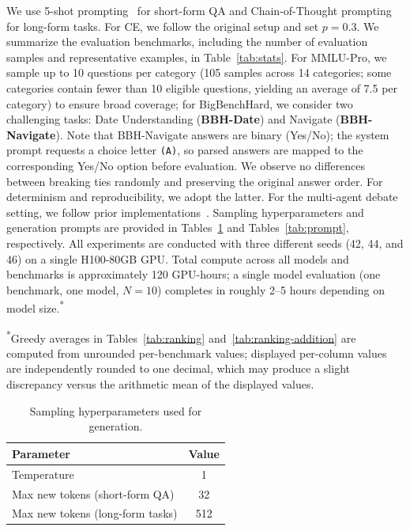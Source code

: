 We use 5-shot prompting~\citep{brown2020language} for short-form QA and Chain-of-Thought prompting~\citep{wei2022chain} for long-form tasks. For CE, we follow the original setup and set $p{=}0.3$. 
We summarize the evaluation benchmarks, including the number of evaluation samples and representative examples, in Table~\ref{tab:stats}. For MMLU-Pro, we sample up to 10 questions per category (105 samples across 14 categories; some categories contain fewer than 10 eligible questions, yielding an average of 7.5 per category) to ensure broad coverage; for BigBenchHard, we consider two challenging tasks: Date Understanding (\textbf{BBH-Date}) and Navigate (\textbf{BBH-Navigate}). Note that BBH-Navigate answers are binary (Yes/No); the system prompt requests a choice letter \texttt{(A)}, so parsed answers are mapped to the corresponding Yes/No option before evaluation.
We observe no differences between breaking ties randomly and preserving the original answer order. For determinism and reproducibility, we adopt the latter. 
For the multi-agent debate setting, we follow prior implementations~\citep{choi2025debate, nguyen2026hear}. Sampling hyperparameters and generation prompts are provided in Tables~\ref{tab:params} and Tables~\ref{tab:prompt}, respectively. All experiments are conducted with three different seeds (42, 44, and 46) on a single H100-80GB GPU. Total compute across all models and benchmarks is approximately 120 GPU-hours; a single model evaluation (one benchmark, one model, $N{=}10$) completes in roughly 2--5 hours depending on model size.\textsuperscript{*}

\textsuperscript{*}Greedy averages in Tables~\ref{tab:ranking} and~\ref{tab:ranking-addition} are computed from unrounded per-benchmark values; displayed per-column values are independently rounded to one decimal, which may produce a slight discrepancy versus the arithmetic mean of the displayed values.

\begin{table}[ht]
\centering
\caption{Sampling hyperparameters used for generation.}
\label{tab:params}
\begin{tabular}{l | c}
\toprule
\textbf{Parameter} & \textbf{Value} \\
\midrule
Temperature & 1 \\
Max new tokens (short-form QA) & 32 \\
Max new tokens (long-form tasks) & 512 \\
\bottomrule
\end{tabular}
\end{table}

